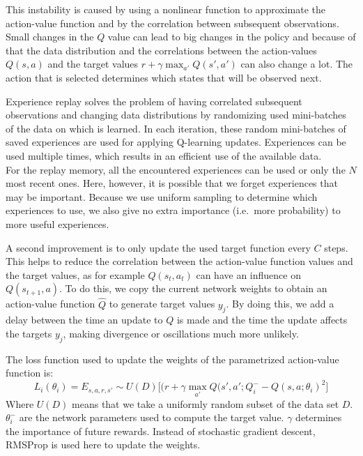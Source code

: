 This instability is caused by using a nonlinear function to approximate the action-value function and by the correlation between subsequent observations.
Small changes in the $Q$ value can lead to big changes in the policy and because of that the data distribution and the correlations between the action-values $Q(s,a)$ and the target values $r+\gamma \max_{a'} Q(s',a')$ can also change a lot.
The action that is selected determines which states that will be observed next.

Experience replay solves the problem of having correlated subsequent observations and changing data distributions by randomizing used mini-batches of the data on which is learned.
In each iteration, these random mini-batches of saved experiences are used for applying Q-learning updates.
Experiences can be used multiple times, which results in an efficient use of the available data.\\
For the replay memory, all the encountered experiences can be used or only the $N$ most recent ones.
Here, however, it is possible that we forget experiences that may be important.
Because we use uniform sampling to determine which experiences to use, we also give no extra importance (i.e.\ more probability) to more useful experiences.

A second improvement is to only update the used target function every $C$ steps.
This helps to reduce the correlation between the action-value function values and the target values, as for example $Q(s_t, a_t)$ can have an influence on $Q(s_{t+1},a)$.
To do this, we copy the current network weights to obtain an action-value function $\hat{Q}$ to generate target values $y_j$.
By doing this, we add a delay between the time an update to $Q$ is made and the time the update affects the targets $y_j$, making divergence or oscillations much more unlikely.

The loss function used to update the weights of the parametrized action-value function is:
\begin{equation}
L_i(\theta_i) = E_{s,a,r,s'} \sim U(D) \big [ (r + \gamma \max_{a'} Q(s',a'; Q^{-}_i - Q(s,a;\theta_i)^2 \big ]
\end{equation}
Where $U(D)$ means that we take a uniformly random subset of the data set $D$. $\theta^{-}_i$ are the network parameters used to compute the target value. $\gamma$ determines the importance of future rewards. Instead of stochastic gradient descent, RMSProp is used here to update the weights.\\

